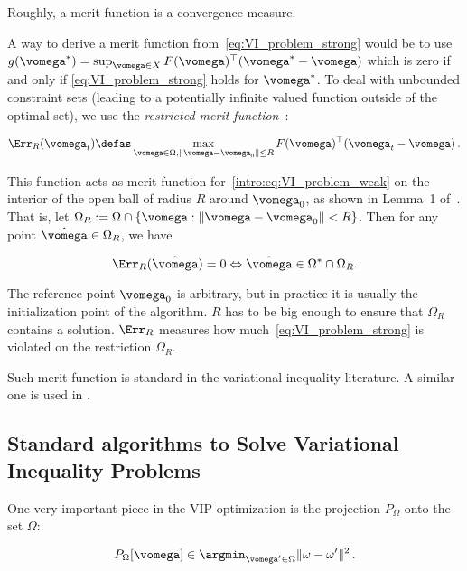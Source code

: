 Roughly, a merit function is a convergence measure.

A way to derive a merit function from~\eqref{eq:VI_problem_strong} would be to use $g(\vomega^*) = \sup_{\vomega \in X} F(\vomega)^\top (\vomega^*-\vomega)$ which is zero if and only if \eqref{eq:VI_problem_strong} holds for $\vomega^*$. To deal with unbounded constraint sets (leading to a potentially infinite valued function outside of the optimal set), we use the \emph{restricted merit function}~\citep{nesterov2007dual}:

\begin{equation}\label{eq:merit_VI}
\Err_R(\vomega_t) \defas \max_{\vomega\in \Omega, \|\vomega-\vomega_0\|\leq R} F(\vomega)^\top(\vomega_t-\vomega) \,.
\end{equation}


This function acts as merit function for~\eqref{intro:eq:VI_problem_weak} on the interior of the open ball of radius $R$ around $\vomega_0$, as shown in Lemma~1 of~\citet{nesterov2007dual}. That is, let $\Omega_R := \Omega \cap \{\vomega : {\|\vomega - \vomega_0\| < R}\}$. Then for any point $\hat \vomega \in \Omega_R$, we have

\begin{equation}
\Err_R(\hat \vomega) = 0 \Leftrightarrow \hat \vomega \in \Omega^*\cap\Omega_R .
\end{equation}

The reference point $\vomega_0$ is arbitrary, but in practice it is usually the initialization point of the algorithm. $R$ has to be big enough to ensure that $\Omega_R$ contains a solution. $\Err_R$ measures how much~\eqref{eq:VI_problem_strong} is violated on the restriction $\Omega_R$.

Such merit function is standard in the variational inequality literature. A similar one is used in \citep{nemirovski_prox-method_2004, juditsky2011solving}.




\subsection{Standard algorithms to Solve Variational Inequality Problems}

One very important piece in the VIP optimization is the projection $P_\Omega$ onto the set $\Omega$:

\begin{equation}
P_\Omega[\vomega] \in \argmin_{\vomega' \in \Omega} \|\omega-\omega'\|^2 \,.
\end{equation}

